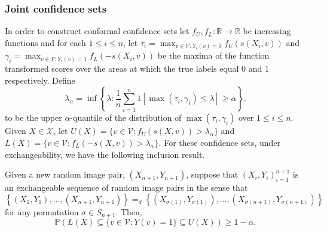\subsubsection{Joint confidence sets}
In order to construct conformal confidence sets let $f_U, f_L:\mathbb{R} \rightarrow \mathbb{R}$ be increasing functions and for each $1\leq i \leq n$, let $\tau_i = \max_{v \in \mathcal{V}: Y_i(v) = 0} f_U(s(X_i,v))$ and $\gamma_i = \max_{v \in \mathcal{V}: Y_i(v) = 1} f_L(-s(X_i,v))$  be the maxima of the function transformed scores over the areas at which the true labels equal 0 and 1 respectively. Define
\begin{equation*}
	\lambda_{\alpha} = \inf\left\lbrace \lambda: \frac{1}{n} \sum_{i = 1}^n 1\left[ \max(\tau_i, \gamma_i) \leq \lambda \right] \geq \alpha \right\rbrace.
\end{equation*}
to be the upper $\alpha$-quantile of the distribution of $\max(\tau_i, \gamma_i)$ over $1 \leq i \leq n$. Given $X \in \mathcal{X}$, let $U(X) = \lbrace v \in \mathcal{V}: f_U(s(X,v)) > \lambda_{\alpha} \rbrace $ and $L(X) = \lbrace v \in \mathcal{V}: f_L(-s(X,v)) > \lambda_{\alpha} \rbrace $. For these confidence sets, under exchangeability, we have the following inclusion result.
\begin{theorem}
	Given a new random image pair, $(X_{n+1},Y_{n+1})$, suppose that $(X_i, Y_i)_{i = 1}^{n+1}$ is an exchangeable sequence of random image pairs in the sense that 
	\begin{equation*}
		\left\lbrace (X_1,Y_1), \dots, (X_{n+1}, Y_{n+1}) \right\rbrace =_d \left\lbrace (X_{\sigma(1)}, Y_{\sigma(1)}), \dots, (X_{\sigma(n+1)}, Y_{\sigma(n+1)}) \right\rbrace
	\end{equation*}
	for any permutation $\sigma \in S_{n+1}$. Then,
\begin{equation}\label{eq:probstat}
	\mathbb{P}\left( L(X) \subseteq \lbrace v\in \mathcal{V}: Y(v) = 1 \rbrace \subseteq U(X) \right) \geq 1 - \alpha.
\end{equation}
\end{theorem}
